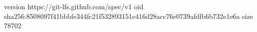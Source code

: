 version https://git-lfs.github.com/spec/v1
oid sha256:8508097f41bbbfe344fc21f532893151e416d28acc76e0739afdfb6b732e1e6a
size 78702
